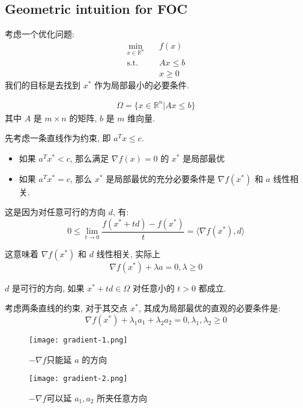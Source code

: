\subsection{Geometric intuition for FOC}
考虑一个优化问题:
\begin{align*}
    \min_{x \in \mathbb{R}^n} & \quad f(x) \\
    \text{s.t.} & \quad Ax \leq b \\
    & \quad x \geq 0
\end{align*}
我们的目标是去找到 $x^*$ 作为局部最小的必要条件.
\begin{definition}
    \begin{align*}
        \Omega = \{x \in \mathbb{R}^n | Ax \leq b\}
    \end{align*}
    其中 $A$ 是 $m \times n$ 的矩阵, $b$ 是 $m$ 维向量.
\end{definition}

先考虑一条直线作为约束, 即 $a^T x \leq c$.
\begin{itemize}
    \item 如果 $a^T x^* < c$, 那么满足 $\nabla f(x)=0$ 的 $x^*$ 是局部最优
    \item 如果 $a^T x^* = c$, 那么 $x^*$ 是局部最优的充分必要条件是 $\nabla f(x^*)$ 和 $a$ 线性相关.
\end{itemize}

这是因为对任意可行的方向 $d$, 有: 
$$0\leq\lim_{t\to 0}\frac{f(x^*+td)-f(x^*)}{t}=\langle\nabla f(x^*),d\rangle$$

这意味着 $\nabla f(x^*)$ 和 $d$ 线性相关, 实际上 
$$\nabla f(x^*)+\lambda a = 0, \lambda \ge 0$$

\begin{definition}
    $d$ 是可行的方向, 如果 $x^*+td \in \Omega$ 对任意小的 $t>0$ 都成立.
\end{definition}
考虑两条直线的约束, 对于其交点 $x^*$, 其成为局部最优的直观的必要条件是:
$$\nabla f(x^*)+\lambda_1 a_1 + \lambda_2 a_2 = 0, \lambda_1, \lambda_2 \ge 0$$

\begin{figure}
    \centering
    \begin{minipage}{0.49\textwidth}
        \centering
        \texttt{[image: gradient-1.png]}
        \caption{$-\nabla f$只能延 $a$ 的方向}
        \label{fig:gradient-1}
    \end{minipage}\hfill
    \begin{minipage}{0.45\textwidth}
        \centering
        \texttt{[image: gradient-2.png]}
        \caption{$-\nabla f$可以延 $a_1,a_2$ 所夹任意方向}
        \label{fig:gradient-2}
    \end{minipage}
\end{figure}

